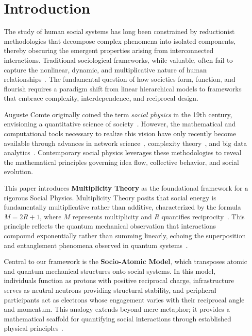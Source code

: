 \documentclass[11pt,a4paper]{article}
\begin{document}
\newpage
\section{Introduction}

The study of human social systems has long been constrained by reductionist methodologies that decompose complex phenomena into isolated components, thereby obscuring the emergent properties arising from interconnected interactions. Traditional sociological frameworks, while valuable, often fail to capture the nonlinear, dynamic, and multiplicative nature of human relationships~\cite{pentland2014,durkheim1893}. The fundamental question of how societies form, function, and flourish requires a paradigm shift from linear hierarchical models to frameworks that embrace complexity, interdependence, and reciprocal design.

Auguste Comte originally coined the term \textit{social physics} in the 19th century, envisioning a quantitative science of society~\cite{comte1856}. However, the mathematical and computational tools necessary to realize this vision have only recently become available through advances in network science~\cite{barabasi2016}, complexity theory~\cite{mitchell2009}, and big data analytics~\cite{pentland2014}. Contemporary social physics leverages these methodologies to reveal the mathematical principles governing idea flow, collective behavior, and social evolution.

This paper introduces \textbf{Multiplicity Theory} as the foundational framework for a rigorous Social Physics. Multiplicity Theory posits that social energy is fundamentally multiplicative rather than additive, characterized by the formula $M = 2R + 1$, where $M$ represents multiplicity and $R$ quantifies reciprocity~\cite{vangelder2024}. This principle reflects the quantum mechanical observation that interactions compound exponentially rather than summing linearly, echoing the superposition and entanglement phenomena observed in quantum systems~\cite{schrodinger1935,bohr1928}.

Central to our framework is the \textbf{Socio-Atomic Model}, which transposes atomic and quantum mechanical structures onto social systems. In this model, individuals function as protons with positive reciprocal charge, infrastructure serves as neutral neutrons providing structural stability, and peripheral participants act as electrons whose engagement varies with their reciprocal angle and momentum. This analogy extends beyond mere metaphor; it provides a mathematical scaffold for quantifying social interactions through established physical principles~\cite{bohm1980}.
\end{document}
